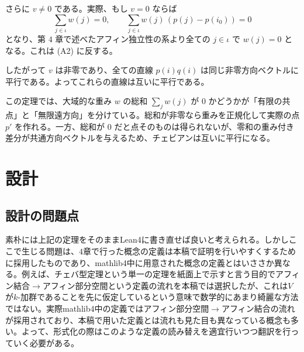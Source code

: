 \documentclass[a4paper,12pt]{bxjsbook}
\makeatletter
\newlength{\customindent}
\newenvironment{body}{
  \par
  \begingroup
  \setlength{\leftskip}{\customindent}
  \setlength{\rightskip}{0pt}
  \setlength{\parindent}{1em}
  \setlength{\displayindent}{\customindent}
  \setlength{\displaywidth}{\dimexpr\linewidth-\customindent\relax}
}{
  \par
  \endgroup
}
\theoremstyle{theorem}
\renewenvironment{proof}[1][\proofname]{%
  \par\pushQED{\qed}%
  \normalfont
  \topsep6\p@\@plus6\p@\relax
  \list{}{%
    \leftmargin=\customindent
    \rightmargin=0pt
    \labelwidth=0pt
    \labelsep=0pt
    \itemindent=0pt
    \listparindent=0pt
    \parsep=0pt
  }%
  \item[\itshape #1\@addpunct{.}\hspace{0.5em}]%
  \setlength{\displayindent}{\customindent}%
  \setlength{\displaywidth}{\dimexpr\linewidth-\customindent\relax}%
  \ignorespaces
}{%
  \popQED\endlist\@endpefalse
}
\makeatother
\begin{document}
\begin{proof}
        さらに $v\neq 0$ である。実際、もし $v=0$ ならば
        \[
          \sum_{j\in\iota} w(j)=0,
          \qquad
          \sum_{j\in\iota} w(j)\,(p(j)-p(i_0))=0
        \]
        となり、第 $4$ 章で述べたアフィン独立性の系より全ての $j\in\iota$ で $w(j)=0$ となる。これは (A2) に反する。

        したがって $v$ は非零であり、全ての直線 $p(i)q(i)$ は同じ非零方向ベクトルに平行である。よってこれらの直線は互いに平行である。
    \end{proof}

    \begin{body}
        \indent この定理では、大域的な重み $w$ の総和 $\sum_j w(j)$ が 0 かどうかが「有限の共点」と「無限遠方向」を分けている。総和が非零なら重みを正規化して実際の点 $p'$ を作れる。一方、総和が 0 だと点そのものは得られないが、零和の重み付き差分が共通方向ベクトルを与えるため、チェビアンは互いに平行になる。
    \end{body}

    \section{設計}
    \subsection{設計の問題点}
    \begin{body}
        \indent 素朴には上記の定理をそのままLean4に書き直せば良いと考えられる。しかしここで生じる問題は、$4$章で行った概念の定義は本稿で証明を行いやすくするために採用したものであり、mathlib4中に用意された概念の定義とはいささか異なる。例えば、チェバ型定理という単一の定理を紙面上で示すと言う目的でアフィン結合$\to$アフィン部分空間という定義の流れを本稿では選択したが、これは$V$が$k$-加群であることを先に仮定しているという意味で数学的にあまり綺麗な方法ではない。実際mathlib4中の定義ではアフィン部分空間$\to$アフィン結合の流れが採用されており、本稿で用いた定義とは流れも見た目も異なっている概念も多い。よって、形式化の際はこのような定義の読み替えを適宜行いつつ翻訳を行っていく必要がある。
    \end{body}
\end{document}
